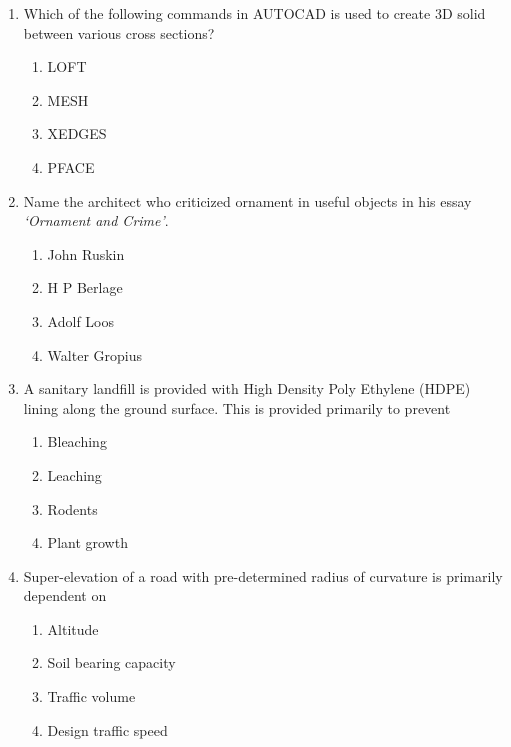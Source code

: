 \documentclass[12pt]{article}
\begin{document}
\begin{enumerate}[label=Q.\arabic*]
	\item Which of the following commands in AUTOCAD is used to create 3D solid between various cross sections?
		\begin{multicols}{4}
			\begin{enumerate}
				\item LOFT
				\item MESH
				\item XEDGES
				\item PFACE
			\end{enumerate}
		\end{multicols}

	\item Name the architect who criticized ornament in useful objects in his essay \textit{‘Ornament and Crime’}.
		\begin{multicols}{2}
			\begin{enumerate}
				\item John Ruskin
				\item H P Berlage
				\item Adolf Loos
				\item Walter Gropius
			\end{enumerate}
		\end{multicols}

	\item A sanitary landfill is provided with High Density Poly Ethylene (HDPE) lining along the ground surface. This is provided primarily to prevent
		\begin{multicols}{2}
			\begin{enumerate}
				\item Bleaching
				\item Leaching
				\item Rodents
				\item Plant growth
			\end{enumerate}
		\end{multicols}

	\item Super-elevation of a road with pre-determined radius of curvature is primarily dependent on
		\begin{enumerate}
			\item Altitude
			\item Soil bearing capacity
			\item Traffic volume
			\item Design traffic speed
		\end{enumerate}


\end{enumerate}
\end{document}

